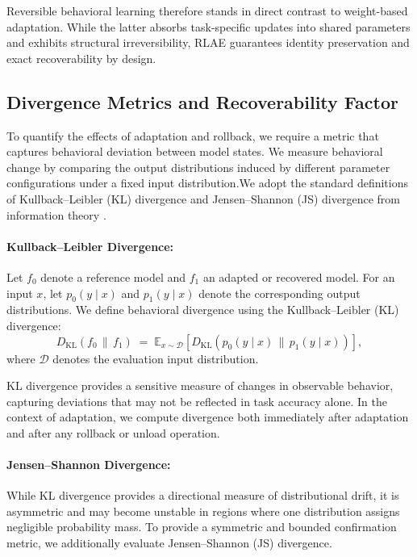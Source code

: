 \documentclass[10pt]{article}
\begin{document}
	Reversible behavioral learning therefore stands in direct contrast to weight-based adaptation. While the latter absorbs task-specific updates into shared parameters and exhibits structural irreversibility, RLAE guarantees identity preservation and exact recoverability by design.
	
	
	\subsection{Divergence Metrics and Recoverability Factor}
	\label{sec:kl_rf}
	
	To quantify the effects of adaptation and rollback, we require a metric that captures behavioral deviation between model states. We measure behavioral change by comparing the output distributions induced by different parameter configurations under a fixed input distribution.We adopt the standard definitions of Kullback–Leibler (KL) divergence and Jensen–Shannon (JS) divergence from information theory \cite{kullback1951information, lin1991divergence, cover2006elements}.
	
	\paragraph{Kullback--Leibler Divergence:}
	
	Let $f_0$ denote a reference model and $f_1$ an adapted or recovered model. For an input $x$, let $p_0(y \mid x)$ and $p_1(y \mid x)$ denote the corresponding output distributions. We define behavioral divergence using the Kullback--Leibler (KL) divergence:
	\[
	D_{\mathrm{KL}}(f_0 \,\|\, f_1)
	\;=\;
	\mathbb{E}_{x \sim \mathcal{D}}
	\left[
	D_{\mathrm{KL}}\!\left(p_0(y \mid x) \,\|\, p_1(y \mid x)\right)
	\right],
	\]
	where $\mathcal{D}$ denotes the evaluation input distribution.
	
	KL divergence provides a sensitive measure of changes in observable behavior, capturing deviations that may not be reflected in task accuracy alone. In the context of adaptation, we compute divergence both immediately after adaptation and after any rollback or unload operation.
	
	\paragraph{Jensen--Shannon Divergence:}
	
	While KL divergence provides a directional measure of distributional drift, it is asymmetric and may become unstable in regions where one distribution assigns negligible probability mass. To provide a symmetric and bounded confirmation metric, we additionally evaluate Jensen--Shannon (JS) divergence.
	
\end{document}
